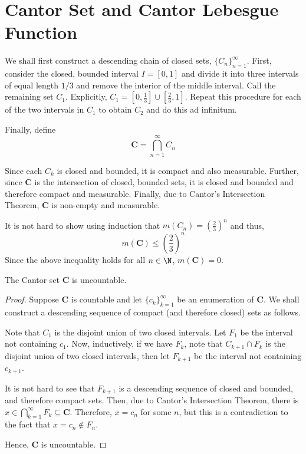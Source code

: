\section{Cantor Set and Cantor Lebesgue Function}

We shall first construct a descending chain of closed sets, $\{C_n\}_{n = 1}^\infty$. First, consider the closed, bounded interval $I = [0,1]$ and divide it into three intervals of equal length $1/3$ and remove the interior of the middle interval. Call the remaining set $C_1$. Explicitly, $C_1 = \left[0,\frac{1}{3}\right]\cup\left[\frac{2}{3}, 1\right]$. Repeat this procedure for each of the two intervals in $C_1$ to obtain $C_2$ and do this ad infinitum.

Finally, define 
\begin{equation*}
    \mathbf{C} = \bigcap_{n = 1}^\infty C_n
\end{equation*}


Since each $C_k$ is closed and bounded, it is compact and also measurable. Further, since $\mathbf C$ is the intersection of closed, bounded sets, it is closed and bounded and therefore compact and measurable. Finally, due to Cantor's Intersection Theorem, $\mathbf{C}$ is non-empty and measurable.

It is not hard to show using induction that $m(C_n) = \left(\frac{2}{3}\right)^n$ and thus, 
\begin{equation*}
    m(\mathbf{C})\le\left(\frac{2}{3}\right)^n
\end{equation*}
Since the above inequality holds for all $n\in\N$, $m(\mathbf C) = 0$.

\begin{proposition}
    The Cantor set $\mathbf{C}$ is uncountable.
\end{proposition}
\begin{proof}
    Suppose $\mathbf C$ is countable and let $\{c_k\}_{k = 1}^\infty$ be an enumeration of $\mathbf C$. We shall construct a descending sequence of compact (and therefore closed) sets as follows.

    Note that $C_1$ is the disjoint union of two closed intervals. Let $F_1$ be the interval not containing $c_1$. Now, inductively, if we have $F_k$, note that $C_{k + 1}\cap F_k$ is the disjoint union of two closed intervals, then let $F_{k + 1}$ be the interval not containing $c_{k + 1}$.

    It is not hard to see that $F_{k + 1}$ is a descending sequence of closed and bounded, and therefore compact sets. Then, due to Cantor's Intersection Theorem, there is $x\in\bigcap_{k = 1}^\infty F_k\subseteq\mathbf C$. Therefore, $x = c_n$ for some $n$, but this is a contradiction to the fact that $x = c_n\notin F_n$.

    Hence, $\mathbf{C}$ is uncountable.
\end{proof}


